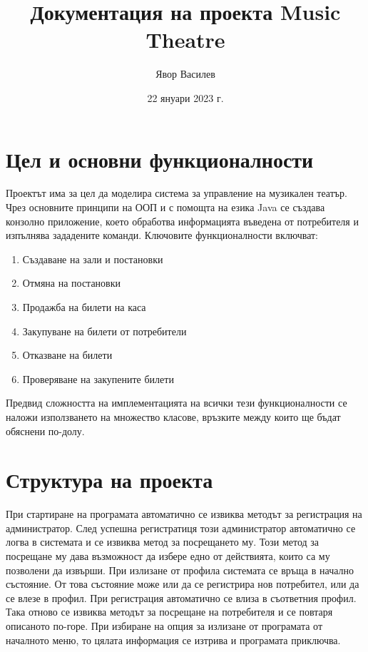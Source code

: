 \documentclass[12pt]{article}
\title{Документация на проекта Music Theatre}
\author{Явор Василев}
\date{22 януари 2023 г.}
\begin{document}
\maketitle

\section{Цел и основни функционалности}

    Проектът има за цел да моделира система за управление на музикален театър. Чрез основните принципи на ООП и с помощта на езика Java се създава конзолно приложение, което обработва информацията въведена от потребителя и изпълнява зададените команди.
    Ключовите функционалности включват:

    \begin{enumerate}
        \item Създаване на зали и постановки
        \item Отмяна на постановки
        \item Продажба на билети на каса
        \item Закупуване на билети от потребители
        \item Отказване на билети
        \item Проверяване на закупените билети
    \end{enumerate}

    Предвид сложността на имплементацията на всички тези функционалности се наложи използването на множество класове, връзките между които ще бъдат обяснени по-долу.

\section{Структура на проекта}

    При стартиране на програмата автоматично се извиква методът за регистрация на администратор. След успешна регистратиця този администратор автоматично се логва в системата и се извиква метод за посрещането му. Този метод за посрещане му дава възможност да избере едно от действията, които са му позволени да извърши. При излизане от профила системата се връща в начално състояние. От това състояние може или да се регистрира нов потребител, или да се влезе в профил. При регистрация автоматично се влиза в съответния профил. Така отново се извиква методът за посрещане на потребителя и се повтаря описаното по-горе. При избиране на опция за излизане от програмата от началното меню, то цялата информация се изтрива и програмата приключва.
\end{document}
